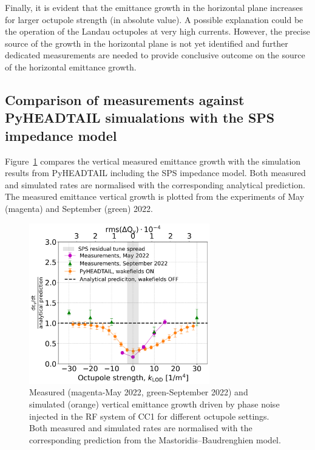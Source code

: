 Finally, it is evident that the emittance growth in the horizontal plane increases for larger octupole strength (in absolute value). A possible explanation could be the operation of the Landau octupoles at very high currents. However, the precise source of the growth in the horizontal plane is not yet identified and further dedicated measurements are needed to provide conclusive outcome on the source of the horizontal emittance growth. 

\subsection{Comparison of measurements against PyHEADTAIL simualations with the SPS impedance model}\label{subsec:comparison_with_pyheadtail_full_scan}
Figure~\ref{fig:cc_md_2022_measurement_vs_pyheadtail_simualtion_sep22} compares the vertical measured emittance growth with the simulation results from PyHEADTAIL including the SPS impedance model. Both measured and simulated rates are normalised with the corresponding analytical prediction. The measured emittance vertical growth is plotted from the experiments of May (magenta) and September (green) 2022.

\begin{figure}[!h]
   \centering         
   \includegraphics[width=0.7\textwidth]{images/Ch8/deyRates_sps_270GeV_PN1e-8_400MHz_SPS_NewWakesAllcontributions_appendWakes_y-plane_WakesONvsOFF_QpxQpy1_6D_Nb5e5_intensity3e10Scan_simulations_vs_measurements_magenta_new_legend_IPAC22_May_and_September_2022_for_thesis.png}
       \caption{Measured (magenta-May 2022, green-September 2022) and simulated (orange) vertical emittance growth driven by phase noise injected in the RF system of CC1 for different octupole settings. Both measured and simulated rates are normalised with the corresponding prediction from the Mastoridis--Baudrenghien model.}
       \label{fig:cc_md_2022_measurement_vs_pyheadtail_simualtion_sep22}
\end{figure}

